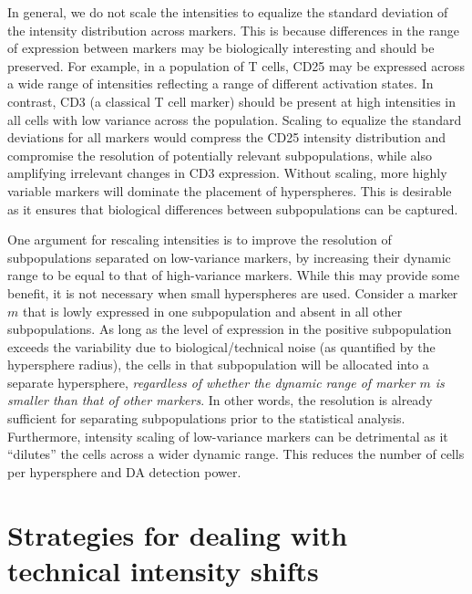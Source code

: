 \documentclass{article}
\begin{document}
In general, we do not scale the intensities to equalize the standard deviation of the intensity distribution across markers.
This is because differences in the range of expression between markers may be biologically interesting and should be preserved.
For example, in a population of T cells, CD25 may be expressed across a wide range of intensities reflecting a range of different activation states.
In contrast, CD3 (a classical T cell marker) should be present at high intensities in all cells with low variance across the population.
Scaling to equalize the standard deviations for all markers would compress the CD25 intensity distribution and compromise the resolution of potentially relevant subpopulations, while also amplifying irrelevant changes in CD3 expression.
Without scaling, more highly variable markers will dominate the placement of hyperspheres.
This is desirable as it ensures that biological differences between subpopulations can be captured. 

One argument for rescaling intensities is to improve the resolution of subpopulations separated on low-variance markers, by increasing their dynamic range to be equal to that of high-variance markers. 
While this may provide some benefit, it is not necessary when small hyperspheres are used.
Consider a marker $m$ that is lowly expressed in one subpopulation and absent in all other subpopulations. 
As long as the level of expression in the positive subpopulation exceeds the variability due to biological/technical noise (as quantified by the hypersphere radius), the cells in that subpopulation will be allocated into a separate hypersphere, \textit{regardless of whether the dynamic range of marker $m$ is smaller than that of other markers}. 
In other words, the resolution is already sufficient for separating subpopulations prior to the statistical analysis. 
Furthermore, intensity scaling of low-variance markers can be detrimental as it ``dilutes'' the cells across a wider dynamic range. 
This reduces the number of cells per hypersphere and DA detection power.

\section{Strategies for dealing with technical intensity shifts}
\end{document}
